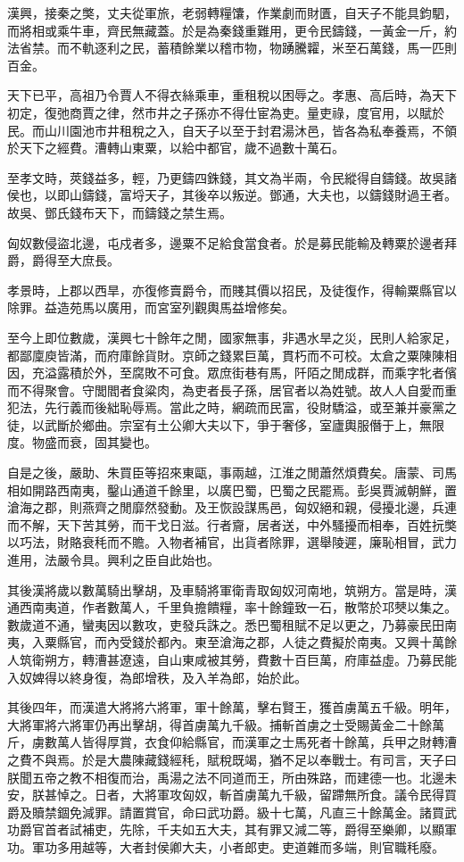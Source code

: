 漢興，接秦之獘，丈夫從軍旅，老弱轉糧馕，作業劇而財匱，自天子不能具鈞駟，而將相或乘牛車，齊民無藏蓋。於是為秦錢重難用，更令民鑄錢，一黃金一斤，約法省禁。而不軌逐利之民，蓄積餘業以稽市物，物踴騰糶，米至石萬錢，馬一匹則百金。

天下已平，高祖乃令賈人不得衣絲乘車，重租稅以困辱之。孝惠、高后時，為天下初定，復弛商賈之律，然市井之子孫亦不得仕宦為吏。量吏祿，度官用，以賦於民。而山川園池市井租稅之入，自天子以至于封君湯沐邑，皆各為私奉養焉，不領於天下之經費。漕轉山東粟，以給中都官，歲不過數十萬石。

至孝文時，莢錢益多，輕，乃更鑄四銖錢，其文為半兩，令民縱得自鑄錢。故吳諸侯也，以即山鑄錢，富埒天子，其後卒以叛逆。鄧通，大夫也，以鑄錢財過王者。故吳、鄧氏錢布天下，而鑄錢之禁生焉。

匈奴數侵盜北邊，屯戍者多，邊粟不足給食當食者。於是募民能輸及轉粟於邊者拜爵，爵得至大庶長。

孝景時，上郡以西旱，亦復修賣爵令，而賤其價以招民，及徒復作，得輸粟縣官以除罪。益造苑馬以廣用，而宮室列觀輿馬益增修矣。

至今上即位數歲，漢興七十餘年之閒，國家無事，非遇水旱之災，民則人給家足，都鄙廩庾皆滿，而府庫餘貨財。京師之錢累巨萬，貫朽而不可校。太倉之粟陳陳相因，充溢露積於外，至腐敗不可食。眾庶街巷有馬，阡陌之閒成群，而乘字牝者儐而不得聚會。守閭閻者食粱肉，為吏者長子孫，居官者以為姓號。故人人自愛而重犯法，先行義而後絀恥辱焉。當此之時，網疏而民富，役財驕溢，或至兼并豪黨之徒，以武斷於鄉曲。宗室有土公卿大夫以下，爭于奢侈，室廬輿服僭于上，無限度。物盛而衰，固其變也。

自是之後，嚴助、朱買臣等招來東甌，事兩越，江淮之閒蕭然煩費矣。唐蒙、司馬相如開路西南夷，鑿山通道千餘里，以廣巴蜀，巴蜀之民罷焉。彭吳賈滅朝鮮，置滄海之郡，則燕齊之閒靡然發動。及王恢設謀馬邑，匈奴絕和親，侵擾北邊，兵連而不解，天下苦其勞，而干戈日滋。行者齎，居者送，中外騷擾而相奉，百姓抏獘以巧法，財賂衰秏而不贍。入物者補官，出貨者除罪，選舉陵遲，廉恥相冒，武力進用，法嚴令具。興利之臣自此始也。

其後漢將歲以數萬騎出擊胡，及車騎將軍衛青取匈奴河南地，筑朔方。當是時，漢通西南夷道，作者數萬人，千里負擔饋糧，率十餘鐘致一石，散幣於邛僰以集之。數歲道不通，蠻夷因以數攻，吏發兵誅之。悉巴蜀租賦不足以更之，乃募豪民田南夷，入粟縣官，而內受錢於都內。東至滄海之郡，人徒之費擬於南夷。又興十萬餘人筑衛朔方，轉漕甚遼遠，自山東咸被其勞，費數十百巨萬，府庫益虛。乃募民能入奴婢得以終身復，為郎增秩，及入羊為郎，始於此。

其後四年，而漢遣大將將六將軍，軍十餘萬，擊右賢王，獲首虜萬五千級。明年，大將軍將六將軍仍再出擊胡，得首虜萬九千級。捕斬首虜之士受賜黃金二十餘萬斤，虜數萬人皆得厚賞，衣食仰給縣官，而漢軍之士馬死者十餘萬，兵甲之財轉漕之費不與焉。於是大農陳藏錢經秏，賦稅既竭，猶不足以奉戰士。有司言，天子曰朕聞五帝之教不相復而治，禹湯之法不同道而王，所由殊路，而建德一也。北邊未安，朕甚悼之。日者，大將軍攻匈奴，斬首虜萬九千級，留蹛無所食。議令民得買爵及贖禁錮免減罪。請置賞官，命曰武功爵。級十七萬，凡直三十餘萬金。諸買武功爵官首者試補吏，先除，千夫如五大夫，其有罪又減二等，爵得至樂卿，以顯軍功。軍功多用越等，大者封侯卿大夫，小者郎吏。吏道雜而多端，則官職秏廢。

